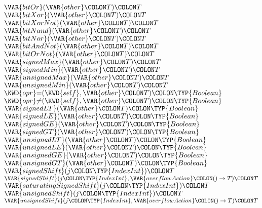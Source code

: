 \begin{Fortress}
\(  \VAR{bitOr}(\VAR{other}\COLON T)\COLON T\)\\
\(  \VAR{bitXor}(\VAR{other}\COLON T)\COLON T\)\\
\(  \VAR{bitXorNot}(\VAR{other}\COLON T)\COLON T\)\\
\(  \VAR{bitNand}(\VAR{other}\COLON T)\COLON T\)\\
\(  \VAR{bitNor}(\VAR{other}\COLON T)\COLON T\)\\
\(  \VAR{bitAndNot}(\VAR{other}\COLON T)\COLON T\)\\
\(  \VAR{bitOrNot}(\VAR{other}\COLON T)\COLON T\)\\
\(  \VAR{signedMax}(\VAR{other}\COLON T)\COLON T\)\\
\(  \VAR{signedMin}(\VAR{other}\COLON T)\COLON T\)\\
\(  \VAR{unsignedMax}(\VAR{other}\COLON T)\COLON T\)\\
\(  \VAR{unsignedMin}(\VAR{other}\COLON T)\COLON T\)\\
\(  \KWD{opr} \mathord{=}(\KWD{self},\VAR{other}\COLON T)\COLON \TYP{Boolean}\)\\
\(  \KWD{opr} \mathord{\neq}(\KWD{self},\VAR{other}\COLON T)\COLON \TYP{Boolean}\)\\
\(  \VAR{signedLT}(\VAR{other}\COLON T)\COLON \TYP{Boolean}\)\\
\(  \VAR{signedLE}(\VAR{other}\COLON T)\COLON \TYP{Boolean}\)\\
\(  \VAR{signedGE}(\VAR{other}\COLON T)\COLON \TYP{Boolean}\)\\
\(  \VAR{signedGT}(\VAR{other}\COLON T)\COLON \TYP{Boolean}\)\\
\(  \VAR{unsignedLT}(\VAR{other}\COLON T)\COLON \TYP{Boolean}\)\\
\(  \VAR{unsignedLE}(\VAR{other}\COLON T)\COLON \TYP{Boolean}\)\\
\(  \VAR{unsignedGE}(\VAR{other}\COLON T)\COLON \TYP{Boolean}\)\\
\(  \VAR{unsignedGT}(\VAR{other}\COLON T)\COLON \TYP{Boolean}\)\\
\(  \VAR{signedShift}(j\COLON \TYP{IndexInt})\COLON T\)\\
\(  \VAR{signedShift}(j\COLON \TYP{IndexInt}, \VAR{overflowAction}\COLON ()\rightarrow{}T)\COLON T\)\\
\(  \VAR{saturatingSignedShift}(j\COLON \TYP{IndexInt})\COLON T\)\\
\(  \VAR{unsignedShift}(j\COLON \TYP{IndexInt})\COLON T\)\\
\(  \VAR{unsignedShift}(j\COLON \TYP{IndexInt}, \VAR{overflowAction}\COLON ()\rightarrow{}T)\COLON T\)\\

\end{Fortress}
